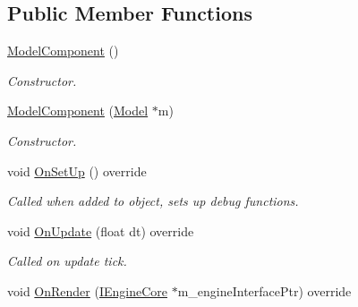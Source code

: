 \subsection*{Public Member Functions}
\begin{DoxyCompactItemize}
\item 
\mbox{\label{class_model_component_a82182f738137f91b12cd90624ca7e458}} 
\mbox{\hyperlink{class_model_component_a82182f738137f91b12cd90624ca7e458}{Model\+Component}} ()
\begin{DoxyCompactList}\small\item\em Constructor. \end{DoxyCompactList}\item 
\mbox{\label{class_model_component_ad2cbf905edaace2b6db04b8a591ff593}} 
\mbox{\hyperlink{class_model_component_ad2cbf905edaace2b6db04b8a591ff593}{Model\+Component}} (\mbox{\hyperlink{class_model}{Model}} $\ast$m)
\begin{DoxyCompactList}\small\item\em Constructor. \end{DoxyCompactList}\item 
\mbox{\label{class_model_component_ac8474d853392a16c6879fdf1bfe6597f}} 
void \mbox{\hyperlink{class_model_component_ac8474d853392a16c6879fdf1bfe6597f}{On\+Set\+Up}} () override
\begin{DoxyCompactList}\small\item\em Called when added to object, sets up debug functions. \end{DoxyCompactList}\item 
\mbox{\label{class_model_component_a5def59776319943854fb5da3dc515051}} 
void \mbox{\hyperlink{class_model_component_a5def59776319943854fb5da3dc515051}{On\+Update}} (float dt) override
\begin{DoxyCompactList}\small\item\em Called on update tick. \end{DoxyCompactList}\item 
\mbox{\label{class_model_component_a2d6c1972533982e1a8c6444a6f0a4120}} 
void \mbox{\hyperlink{class_model_component_a2d6c1972533982e1a8c6444a6f0a4120}{On\+Render}} (\mbox{\hyperlink{class_i_engine_core}{I\+Engine\+Core}} $\ast$m\+\_\+engine\+Interface\+Ptr) override

\end{DoxyCompactItemize}
